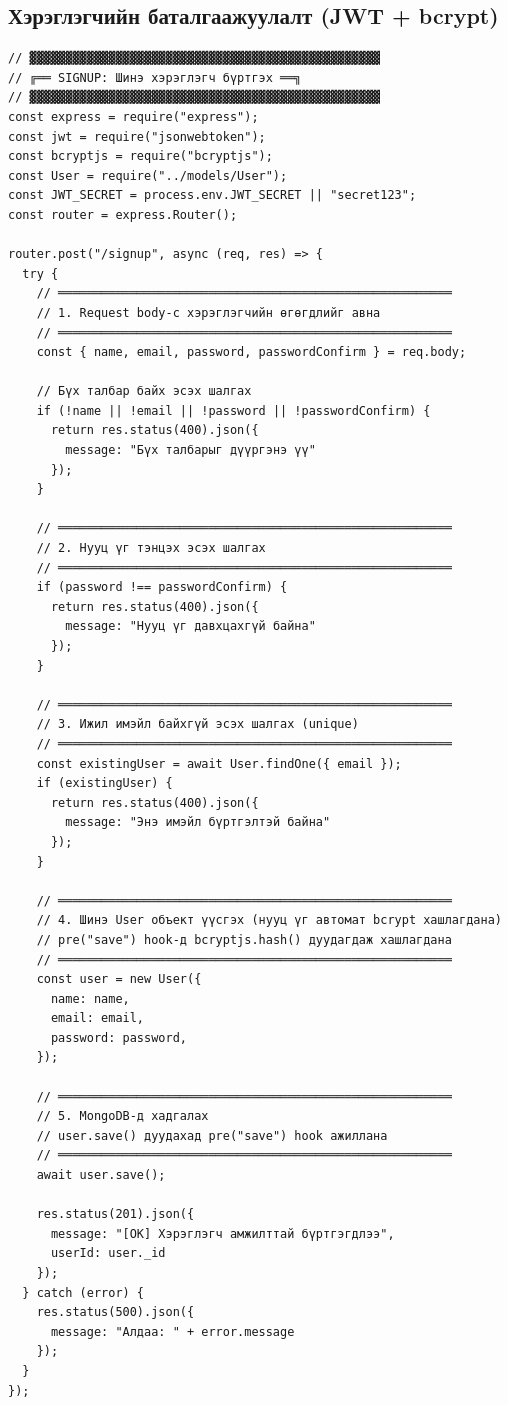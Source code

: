 \subsection{Хэрэглэгчийн баталгаажуулалт (JWT + bcrypt)}

\begin{lstlisting}[caption={routes/auth.js -- Бүртгэх endpoint}]
// ▓▓▓▓▓▓▓▓▓▓▓▓▓▓▓▓▓▓▓▓▓▓▓▓▓▓▓▓▓▓▓▓▓▓▓▓▓▓▓▓▓▓▓▓▓▓▓▓▓
// ╔══ SIGNUP: Шинэ хэрэглэгч бүртгэх ══╗
// ▓▓▓▓▓▓▓▓▓▓▓▓▓▓▓▓▓▓▓▓▓▓▓▓▓▓▓▓▓▓▓▓▓▓▓▓▓▓▓▓▓▓▓▓▓▓▓▓▓
const express = require("express");
const jwt = require("jsonwebtoken");
const bcryptjs = require("bcryptjs");
const User = require("../models/User");
const JWT_SECRET = process.env.JWT_SECRET || "secret123";
const router = express.Router();

router.post("/signup", async (req, res) => {
  try {
    // ═══════════════════════════════════════════════════════
    // 1. Request body-с хэрэглэгчийн өгөгдлийг авна
    // ═══════════════════════════════════════════════════════
    const { name, email, password, passwordConfirm } = req.body;

    // Бүх талбар байх эсэх шалгах
    if (!name || !email || !password || !passwordConfirm) {
      return res.status(400).json({
        message: "Бүх талбарыг дүүргэнэ үү"
      });
    }

    // ═══════════════════════════════════════════════════════
    // 2. Нууц үг тэнцэх эсэх шалгах
    // ═══════════════════════════════════════════════════════
    if (password !== passwordConfirm) {
      return res.status(400).json({
        message: "Нууц үг давхцахгүй байна"
      });
    }

    // ═══════════════════════════════════════════════════════
    // 3. Ижил имэйл байхгүй эсэх шалгах (unique)
    // ═══════════════════════════════════════════════════════
    const existingUser = await User.findOne({ email });
    if (existingUser) {
      return res.status(400).json({
        message: "Энэ имэйл бүртгэлтэй байна"
      });
    }

    // ═══════════════════════════════════════════════════════
    // 4. Шинэ User объект үүсгэх (нууц үг автомат bcrypt хашлагдана)
    // pre("save") hook-д bcryptjs.hash() дуудагдаж хашлагдана
    // ═══════════════════════════════════════════════════════
    const user = new User({
      name: name,
      email: email,
      password: password,
    });

    // ═══════════════════════════════════════════════════════
    // 5. MongoDB-д хадгалах
    // user.save() дуудахад pre("save") hook ажиллана
    // ═══════════════════════════════════════════════════════
    await user.save();

    res.status(201).json({
      message: "[OK] Хэрэглэгч амжилттай бүртгэгдлээ",
      userId: user._id
    });
  } catch (error) {
    res.status(500).json({
      message: "Алдаа: " + error.message
    });
  }
});

\end{lstlisting}

